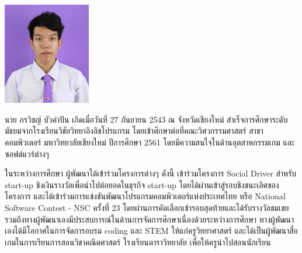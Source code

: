 \documentclass[semifinal]{cpecmu}
\author{กรวิชญ์ บัวคำปัน}{Goravit Buakampun}{610610567}
\author{กิตติพงษ์ ไมล์หรือ}{Kittipong Milerue}{610610570}
\begin{document}


\pagestyle{empty}\cleardoublepage
\normalspacing \setcounter{page}{1}  \pagestyle{cpecmu}





\ifproject

\fi



\ifproject
\appendix


\ifglossary\glossarypage\fi

\ifindex\indexpage\fi

\begin{biosketch}
\begin{center}
  \includegraphics[width=1.5in]{pic-toro/me.jpg}
\end{center}
นาย กรวิชญ์ บัวคำปัน เกิดเมื่อวันที่ 27 กันยายน 2543 ณ จังหวัดเชียงใหม่ สำเร็จการศึกษาระดับมัธยมจากโรงเรียนวิชัยวิทยาอิงลิชโปรแกรม โดยเข้าศึกษาต่อที่คณะวิศวกรรมศาสตร์ สาขาคอมพิวเตอร์ มหาวิทยาลัยเชียงใหม่ ปีการศึกษา 2561
โดยมีความสนใจในด้านอุตสาหกรรมเกม และซอฟต์แวร์ต่างๆ

ในระหว่างการศึกษา ผู้พัฒนาได้เข้าร่วมโครงการต่างๆ ดังนี้ เข้าร่วมโครงการ Social Driver สำหรับ start-up ชิงเงินรางวัลเพื่อนำไปต่อยอดในธุรกิจ start-up โดยได้ผ่านเข้าสู่รอบชิงชนะเลิศของโครงการ
และได้เข้าร่วมการแข่งขันพัฒนาโปรแกรมคอมพิวเตอร์แห่งประเทศไทย หรือ National Software Contest - NSC ครั้งที่ 23 โดยผ่านการคัดเลือกเข้ารอบสุดท้ายและได้รับรางวัลชมเชย รวมถึงทางผู้พัฒนาเองมีประสบการณ์ในด้านการจัดการศึกษาเนื่องด้วยระหว่างการศึกษา
ทางผู้พัฒนาเองได้มีโอกาศในการจัดการอบรม coding และ STEM ให้แก่ครูวิทยาศาสตร์ และได้เป็นผู้พัฒนาสื่อเกมในการเรียนการสอนวิชาคณิตศาสตร์ โรงเรียนดาราวิทยาลัย เพื่อให้ครูนำไปสอนนักเรียน

\bigskip


\end{biosketch}
\end{document}
